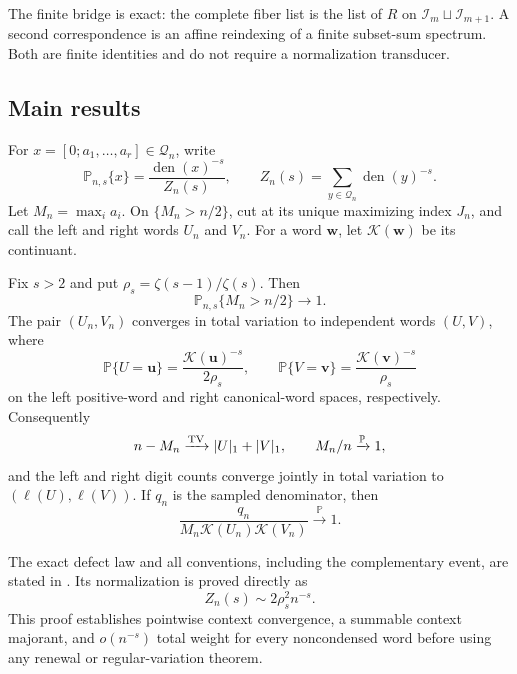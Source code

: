 The finite bridge is exact: the complete fiber list is the list of \(R\) on
\(\mathcal I_m\sqcup\mathcal I_{m+1}\).  A second correspondence is an affine
reindexing of a finite subset-sum spectrum.  Both are finite identities and
do not require a normalization transducer.

\subsection{Main results}

For \(x=[0;a_1,\ldots,a_r]\in\mathcal Q_n\), write
\[
 \mathbb P_{n,s}\{x\}=\frac{\operatorname{den}(x)^{-s}}{Z_n(s)},
 \qquad Z_n(s)=\sum_{y\in\mathcal Q_n}\operatorname{den}(y)^{-s}.
\]
Let \(M_n=\max_i a_i\).  On \(\{M_n>n/2\}\), cut at its unique maximizing
index \(J_n\), and call the left and right words \(U_n\) and \(V_n\).
For a word \(\mathbf w\), let \(\mathcal K(\mathbf w)\) be its continuant.

\begin{theoremA}
Fix \(s>2\) and put \(\rho_s=\zeta(s-1)/\zeta(s)\).  Then
\[
 \mathbb P_{n,s}\{M_n>n/2\}\longrightarrow1.
\]
The pair \((U_n,V_n)\) converges in total variation to independent words
\((U,V)\), where
\[
 \mathbb P\{U=\mathbf u\}=\frac{\mathcal K(\mathbf u)^{-s}}{2\rho_s},
 \qquad
 \mathbb P\{V=\mathbf v\}=\frac{\mathcal K(\mathbf v)^{-s}}{\rho_s}
\]
on the left positive-word and right canonical-word spaces, respectively.
Consequently
\[
 n-M_n\xrightarrow{\rm TV}|U|_1+|V|_1,
 \qquad M_n/n\xrightarrow{\mathbb P}1,
\]
and the left and right digit counts converge jointly in total variation to
\((\ell(U),\ell(V))\).  If \(q_n\) is the sampled denominator, then
\[
 \frac{q_n}{M_n\mathcal K(U_n)\mathcal K(V_n)}
 \xrightarrow{\mathbb P}1.
\]
\end{theoremA}

The exact defect law and all conventions, including the complementary
event, are stated in .  Its normalization is
proved directly as
\begin{equation}
 Z_n(s)\sim2\rho_s^2n^{-s}.
 \label{eq:introduction-brocot-normalization}
\end{equation}
This proof establishes pointwise context convergence, a summable context
majorant, and \(o(n^{-s})\) total weight for every noncondensed word before
using any renewal or regular-variation theorem.

